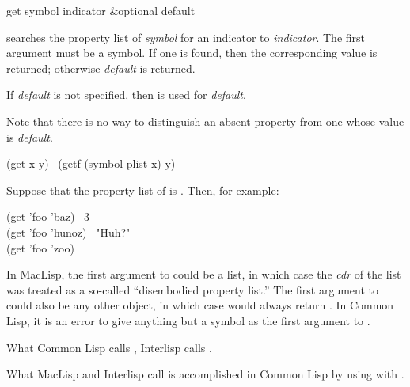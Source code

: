 \begin{defun}[Function]
get symbol indicator &optional default

 searches the property list of
{\it symbol} for an indicator  to {\it indicator}.
The first argument must be a symbol.
If one is found, then the corresponding value is returned;
otherwise {\it default} is returned.

If {\it default} is not specified,
then {\false} is used for {\it default}.

Note that there is no way to distinguish an absent property from
one whose value is {\it default}.
\begin{lisp}
(get x y) \EQ\ (getf (symbol-plist x) y)
\end{lisp}
Suppose that the property list of  is .
Then, for example:
\begin{lisp}
(get 'foo 'baz) \EV\ 3 \\
(get 'foo 'hunoz) \EV\ "Huh?" \\
(get 'foo 'zoo) \EV\ {\false}
\end{lisp}

\beforenoterule
\begin{incompatibility}
In MacLisp, the first argument to  could
be a list, in which case the {\it cdr} of the list was treated
as a so-called ``disembodied property list.''
The first argument to 
could also be any other object, in which case  would 
always return {\nil}.  In Common Lisp, it is an error to give anything
but a symbol as the first argument to .

What Common Lisp calls , Interlisp calls .

What MacLisp and Interlisp call  is accomplished
in Common Lisp by using  with .
\end{incompatibility}
\afternoterule



\end{defun}

